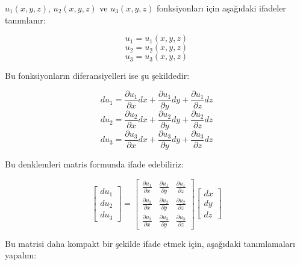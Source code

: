 \documentclass[11pt,letterpaper,twocolumn]{fenbil}
\begin{document}
$u_1(x, y, z)$, $u_2(x, y, z)$ ve $u_3(x, y, z)$ fonksiyonları için aşağıdaki ifadeler tanımlanır:

\begin{equation}
u_1 = u_1(x, y, z)
\end{equation}
\begin{equation}
u_2 = u_2(x, y, z)
\end{equation}
\begin{equation}
u_3 = u_3(x, y, z)
\end{equation}

Bu fonksiyonların diferansiyelleri ise şu şekildedir:

\begin{equation}
du_1 = \frac{\partial u_1}{\partial x} dx + \frac{\partial u_1}{\partial y} dy + \frac{\partial u_1}{\partial z} dz
\end{equation}
\begin{equation}
du_2 = \frac{\partial u_2}{\partial x} dx + \frac{\partial u_2}{\partial y} dy + \frac{\partial u_2}{\partial z} dz
\end{equation}
\begin{equation}
du_3 = \frac{\partial u_3}{\partial x} dx + \frac{\partial u_3}{\partial y} dy + \frac{\partial u_3}{\partial z} dz
\end{equation}

Bu denklemleri matris formunda ifade edebiliriz:

\begin{equation}
\begin{bmatrix} du_1 \\ du_2 \\ du_3 \end{bmatrix} = 
\begin{bmatrix}
\frac{\partial u_1}{\partial x} & \frac{\partial u_1}{\partial y} & \frac{\partial u_1}{\partial z} \\
\frac{\partial u_2}{\partial x} & \frac{\partial u_2}{\partial y} & \frac{\partial u_2}{\partial z} \\
\frac{\partial u_3}{\partial x} & \frac{\partial u_3}{\partial y} & \frac{\partial u_3}{\partial z}
\end{bmatrix}
\begin{bmatrix} dx \\ dy \\ dz \end{bmatrix}
\end{equation}

Bu matrisi daha kompakt bir şekilde ifade etmek için, aşağıdaki tanımlamaları yapalım:
\end{document}
